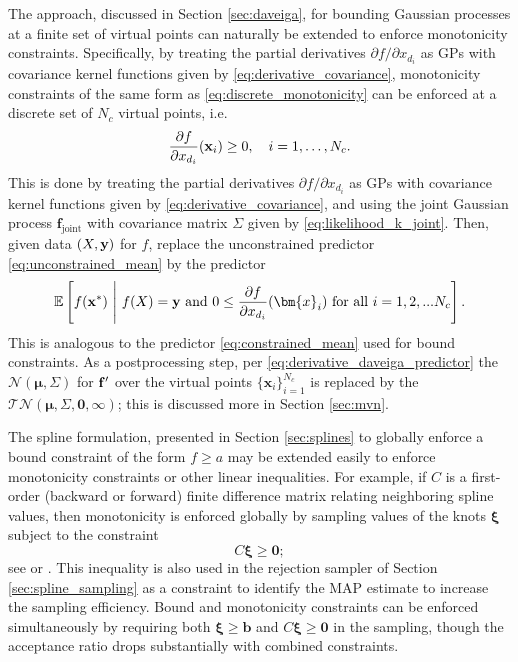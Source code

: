 \label{daveiga_monotonic}
The approach, discussed in Section \ref{sec:daveiga}, for bounding Gaussian processes at a finite set of virtual points can naturally be extended to enforce monotonicity constraints. Specifically, by treating the partial derivatives ${\partial f}/{\partial x_{d_i}}$ as GPs with covariance kernel functions given by \eqref{eq:derivative_covariance}, monotonicity constraints of the same form as \eqref{eq:discrete_monotonicity} can be enforced at a discrete set of $N_c$ virtual points, i.e.
\begin{equation}
\frac{\partial f}{\partial x_{d_i}} (\bold{x}_i) \ge 0,\quad  i = 1, \ldots, N_c.
\end{equation}
This is done by treating the partial derivatives ${\partial f}/{\partial x_{d_i}}$ as GPs with covariance kernel functions given by \eqref{eq:derivative_covariance}, and using the joint Gaussian process $\mathbf{f}_{\text{joint}}$ with covariance matrix $\Sigma$ given by \eqref{eq:likelihood_k_joint}. 
Then, given data $(X,\bold{y})$ for $f$, 
 replace the unconstrained predictor \eqref{eq:unconstrained_mean} by the predictor
\begin{equation}\label{eq:derivative_daveiga_predictor}
\mathbb{E}\left[ f(\bold{x}^*) \ \Bigg| \ f(X) = \bold{y} \text{ and } 
0 \le \frac{\partial f}{\partial x_{d_i}}(\bm{x}_i) 
\text{ for all $i = 1, 2, ... N_c$}\right].
\end{equation}
This is analogous to the predictor \eqref{eq:constrained_mean} used for bound constraints. 
As a postprocessing step, per  \eqref{eq:derivative_daveiga_predictor} the  $\mathcal{N}(\bm{\mu},\Sigma)$ for $\bold{f}'$ over the virtual points $\{\mathbf{x}_i\}_{i=1}^{N_c}$ is replaced by the  $\mathcal{TN}(\bm{\mu},\Sigma,\bm{0},\bm{\infty})$; this  is discussed more in Section \ref{sec:mvn}.

\label{sec:splines_monotonic}
The spline formulation, presented in Section \ref{sec:splines} to globally enforce a bound constraint of the form $f \ge a$  may be extended easily to enforce monotonicity constraints or other linear inequalities. For example, if $C$ is a first-order (backward or forward) finite difference matrix relating neighboring spline values, then monotonicity is enforced globally by sampling values of the knots $\bm{\xi}$ subject to the constraint
\begin{equation}
C\bm{\xi} \geq \mathbf{0};
\end{equation}
see  or .
This inequality is also used in the rejection sampler of Section \ref{sec:spline_sampling} as a constraint to identify the MAP estimate to increase the sampling efficiency.
Bound and monotonicity constraints can be enforced simultaneously by requiring both $\bm{\xi} \geq \mathbf{b}$ and $C\bm{\xi} \geq \mathbf{0}$ in the sampling, though the acceptance ratio drops substantially with combined constraints.

